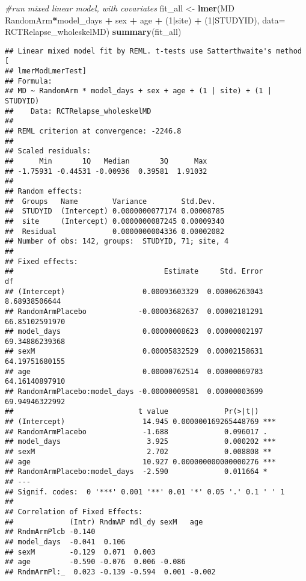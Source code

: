 \documentclass[]{article}
\newenvironment{Shaded}{\begin{snugshade}}{\end{snugshade}}
\newcommand{\KeywordTok}[1]{\textcolor[rgb]{0.13,0.29,0.53}{\textbf{#1}}}
\newcommand{\DataTypeTok}[1]{\textcolor[rgb]{0.13,0.29,0.53}{#1}}
\newcommand{\DecValTok}[1]{\textcolor[rgb]{0.00,0.00,0.81}{#1}}
\newcommand{\StringTok}[1]{\textcolor[rgb]{0.31,0.60,0.02}{#1}}
\newcommand{\CommentTok}[1]{\textcolor[rgb]{0.56,0.35,0.01}{\textit{#1}}}
\newcommand{\OperatorTok}[1]{\textcolor[rgb]{0.81,0.36,0.00}{\textbf{#1}}}
\newcommand{\NormalTok}[1]{#1}
\theoremstyle{definition}
\theoremstyle{definition}
\theoremstyle{definition}
\theoremstyle{remark}
\begin{document}
\begin{Shaded}
\begin{Highlighting}[]
\CommentTok{#run mixed linear model, with covariates}
\NormalTok{fit_all <-}\StringTok{ }\KeywordTok{lmer}\NormalTok{(MD }\OperatorTok{~}\StringTok{ }\NormalTok{RandomArm}\OperatorTok{*}\NormalTok{model_days }\OperatorTok{+}\StringTok{ }\NormalTok{sex }\OperatorTok{+}\StringTok{ }\NormalTok{age }\OperatorTok{+}\StringTok{ }\NormalTok{(}\DecValTok{1}\OperatorTok{|}\NormalTok{site) }\OperatorTok{+}\StringTok{ }\NormalTok{(}\DecValTok{1}\OperatorTok{|}\NormalTok{STUDYID), }\DataTypeTok{data=}\NormalTok{ RCTRelapse_wholeskelMD)}
\KeywordTok{summary}\NormalTok{(fit_all)}
\end{Highlighting}
\end{Shaded}

\begin{verbatim}
## Linear mixed model fit by REML. t-tests use Satterthwaite's method [
## lmerModLmerTest]
## Formula: 
## MD ~ RandomArm * model_days + sex + age + (1 | site) + (1 | STUDYID)
##    Data: RCTRelapse_wholeskelMD
## 
## REML criterion at convergence: -2246.8
## 
## Scaled residuals: 
##      Min       1Q   Median       3Q      Max 
## -1.75931 -0.44531 -0.00936  0.39581  1.91032 
## 
## Random effects:
##  Groups   Name        Variance        Std.Dev.  
##  STUDYID  (Intercept) 0.0000000077174 0.00008785
##  site     (Intercept) 0.0000000087245 0.00009340
##  Residual             0.0000000004336 0.00002082
## Number of obs: 142, groups:  STUDYID, 71; site, 4
## 
## Fixed effects:
##                                   Estimate     Std. Error             df
## (Intercept)                  0.00093603329  0.00006263043  8.68938506644
## RandomArmPlacebo            -0.00003682637  0.00002181291 66.85102591970
## model_days                   0.00000008623  0.00000002197 69.34886239368
## sexM                         0.00005832529  0.00002158631 64.19751680155
## age                          0.00000762514  0.00000069783 64.16140897910
## RandomArmPlacebo:model_days -0.00000009581  0.00000003699 69.94946322992
##                             t value             Pr(>|t|)    
## (Intercept)                  14.945 0.000000169265448769 ***
## RandomArmPlacebo             -1.688             0.096017 .  
## model_days                    3.925             0.000202 ***
## sexM                          2.702             0.008808 ** 
## age                          10.927 0.000000000000000276 ***
## RandomArmPlacebo:model_days  -2.590             0.011664 *  
## ---
## Signif. codes:  0 '***' 0.001 '**' 0.01 '*' 0.05 '.' 0.1 ' ' 1
## 
## Correlation of Fixed Effects:
##             (Intr) RndmAP mdl_dy sexM   age   
## RndmArmPlcb -0.140                            
## model_days  -0.041  0.106                     
## sexM        -0.129  0.071  0.003              
## age         -0.590 -0.076  0.006 -0.086       
## RndmArmPl:_  0.023 -0.139 -0.594  0.001 -0.002
\end{verbatim}
\end{document}
